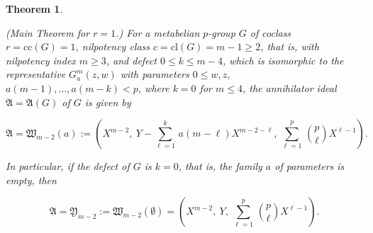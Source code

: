 \documentclass{amsart}
\newtheorem{theorem}{Theorem}[section]
\theoremstyle{definition}
\numberwithin{equation}{section}
\begin{document}
\begin{theorem}
\label{thm:SmbOrdMaxP}

(Main Theorem for \(r=1\).)
For a metabelian \(p\)-group \(G\) of coclass \(r=\mathrm{cc}(G)=1\), nilpotency class \(c=\mathrm{cl}(G)=m-1\ge 2\),
that is, with nilpotency index \(m\ge 3\), and defect \(0\le k\le m-4\),
which is isomorphic to the representative \(G_a^m(z,w)\) with parameters \(0\le w,z\), \(a(m-1),\ldots,a(m-k)<p\),
where \(k=0\) for \(m\le 4\), the annihilator ideal \(\mathfrak{A}=\mathfrak{A}(G)\) of \(G\) is given by

\begin{equation}
\label{eqn:SmbOrdMaxPWithDef}
\mathfrak{A}=\mathfrak{W}_{m-2}(a):=\left(X^{m-2},\ Y-\sum_{\ell=1}^k\,a(m-\ell)X^{m-2-\ell},\ \sum_{\ell=1}^p\,\binom{p}{\ell}X^{\ell-1}\right).
\end{equation}

\noindent
In particular, if the defect of \(G\) is \(k=0\), that is, the family \quad \(a\) \quad of parameters is empty, then

\begin{equation}
\label{eqn:SmbOrdMaxP}
\mathfrak{A}=\mathfrak{Y}_{m-2}:=\mathfrak{W}_{m-2}(\emptyset)=\left(X^{m-2},\ Y,\ \sum_{\ell=1}^p\,\binom{p}{\ell}X^{\ell-1}\right).
\end{equation}

\end{theorem}
\end{document}
